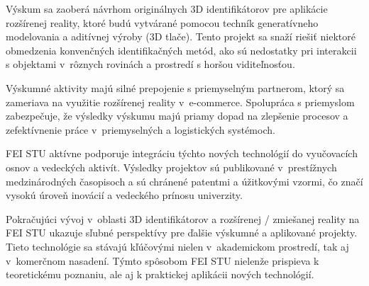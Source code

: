 Výskum sa zaoberá návrhom originálnych 3D identifikátorov pre aplikácie rozšírenej reality, ktoré budú vytvárané pomocou techník generatívneho modelovania a aditívnej výroby (3D tlače). Tento projekt sa snaží riešiť niektoré obmedzenia konvenčných identifikačných metód, ako sú nedostatky pri interakcii s objektami v~rôznych rovinách a prostredí s horšou viditeľnosťou.

Výskumné aktivity majú silné prepojenie s priemyselným partnerom, ktorý sa zameriava na využitie rozšírenej reality v~e-commerce. Spolupráca s priemyslom zabezpečuje, že výsledky výskumu majú priamy dopad na zlepšenie procesov a zefektívnenie práce v~priemyselných a logistických systémoch.

FEI STU aktívne podporuje integráciu týchto nových technológií do vyučovacích osnov a vedeckých aktivít. Výsledky projektov sú publikované v~prestížnych medzinárodných časopisoch a sú chránené patentmi a úžitkovými vzormi, čo značí vysokú úroveň inovácií a vedeckého prínosu univerzity.

Pokračujúci vývoj v~oblasti 3D identifikátorov a rozšírenej / zmiešanej reality na FEI STU ukazuje sľubné perspektívy pre ďalšie výskumné a aplikované projekty. Tieto technológie sa stávajú kľúčovými nielen v~akademickom prostredí, tak aj v~komerčnom nasadení. Týmto spôsobom FEI STU nielenže prispieva k teoretickému poznaniu, ale aj k praktickej aplikácii nových technológií.




